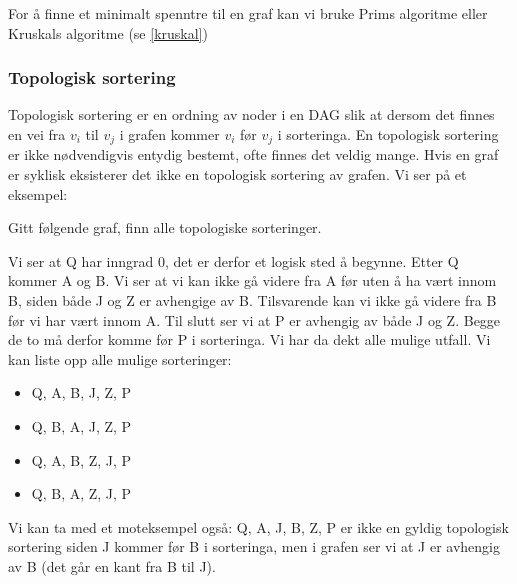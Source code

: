For å finne et minimalt spenntre til en graf kan vi bruke Prims algoritme eller Kruskals algoritme  (se \ref{kruskal})


\subsubsection{Topologisk sortering}
Topologisk sortering er en ordning av noder i en DAG slik at dersom det finnes en vei fra $ v_i $ til $ v_j $ i grafen kommer $ v_i $ før $ v_j $ i sorteringa. En topologisk sortering er ikke nødvendigvis entydig bestemt, ofte finnes det veldig mange. Hvis en graf er syklisk eksisterer det ikke en topologisk sortering av grafen. Vi ser på et eksempel: 

\begin{example} Gitt følgende graf, finn alle topologiske sorteringer.
\begin{figure}[H]
\centering
{}
\end{figure}

Vi ser at Q har inngrad 0, det er derfor et logisk sted å begynne. Etter Q kommer A og B. Vi ser at vi kan ikke gå videre fra A før uten å ha vært innom B, siden både J og Z er avhengige av B. Tilsvarende kan vi ikke gå videre fra B før vi har vært innom A. Til slutt ser vi at P er avhengig av både J og Z. Begge de to må derfor komme før P i sorteringa. Vi har da dekt alle mulige utfall. Vi kan liste opp alle mulige sorteringer:
\begin{itemize}
\item Q, A, B, J, Z, P
\item Q, B, A, J, Z, P
\item Q, A, B, Z, J, P
\item Q, B, A, Z, J, P
\end{itemize}

Vi kan ta med et moteksempel også: Q, A, J, B, Z, P er ikke en gyldig topologisk sortering siden J kommer før B i sorteringa, men i grafen ser vi at J er avhengig av B (det går en kant fra B til J).
\end{example}



